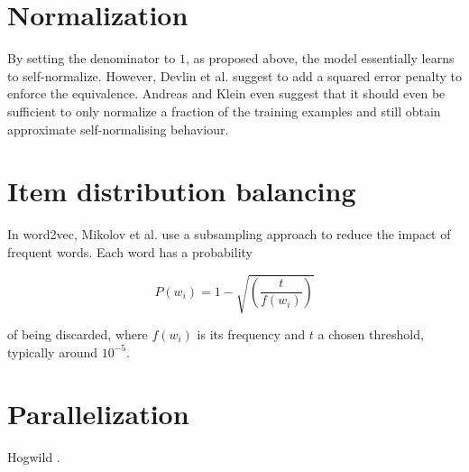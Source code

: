\documentclass[a4paper,oneside,12pt]{article}
\begin{document}
\section{Normalization}

By setting the denominator to $1$, as proposed above, the model essentially learns to self-normalize.
However, Devlin et al. \cite{devlin-etal-2014-fast} suggest to add a squared error penalty to enforce the equivalence.
Andreas and Klein \cite{andreas-norm} even suggest that it should even be sufficient to only normalize a fraction of the training examples and still obtain approximate self-normalising behaviour.


\section{Item distribution balancing}

In word2vec, Mikolov et al. \cite{Mikolov2013DistributedRO} use a subsampling approach to reduce the impact of frequent words.
Each word has a probability

\begin{equation}
P(w_i) = 1 - \sqrt{ \left( \frac{t}{f(w_i)} \right) }
\end{equation}

of being discarded, where $f(w_i)$ is its frequency and $t$ a chosen threshold, typically around $10^{-5}$.


\section{Parallelization}

Hogwild \cite{Recht2011HogwildAL}.


\printbibliography
\end{document}
